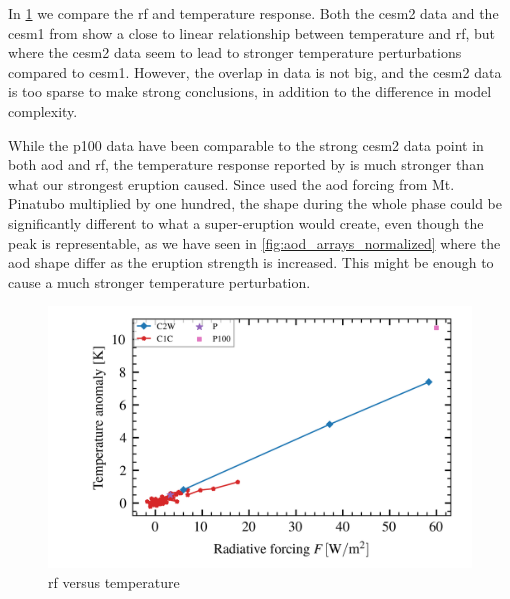 \documentclass[twocol]{ametsocV5}
\begin{document}
In \cref{fig:toa_vs_temp} we compare the \acrshort{rf} and temperature response. Both
the \acrshort{cesm2} data and the \acrshort{cesm1} from \citet{ottobliesner2016} show a
close to linear relationship between temperature and \acrshort{rf}, but where the
\acrshort{cesm2} data seem to lead to stronger temperature perturbations compared to
\acrshort{cesm1}. However, the overlap in data is not big, and the \acrshort{cesm2} data
is too sparse to make strong conclusions, in addition to the difference in model
complexity.

While the \acrshort{p100} data have been comparable to the strong \acrshort{cesm2} data
point in both \acrshort{aod} and \acrshort{rf}, the temperature response reported by
\citet{jones2005} is much stronger than what our strongest eruption caused. Since
\citet{jones2005} used the \acrshort{aod} forcing from Mt. Pinatubo multiplied by one
hundred, the shape during the whole phase could be significantly different to what a
super-eruption would create, even though the peak is representable, as we have seen in
\cref{fig:aod_arrays_normalized} where the \acrshort{aod} shape differ as the eruption
strength is increased. This might be enough to cause a much stronger temperature
perturbation.

\begin{figure}[t]
  \begin{center}
    \includegraphics[width=0.95\linewidth]{figures/toa_vs_temperature.png}
  \end{center}
  \caption{\acrshort{rf} versus temperature}%
  \label{fig:toa_vs_temp}
\end{figure}

\clearpage

\end{document}
